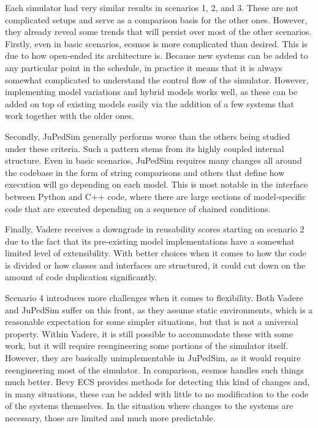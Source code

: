 \documentclass[twoside, 11pt]{article}
\begin{document}
Each simulator had very similar results in scenarios 1, 2, and 3. These are not complicated setups and serve as a comparison basis for the other ones. However, they already reveal some trends that will persist over most of the other scenarios. Firstly, even in basic scenarios, \gls{ecsmos} is more complicated than desired. This is due to how open-ended its architecture is. Because new systems can be added to any particular point in the schedule, in practice it means that it is always somewhat complicated to understand the control flow of the simulator. However, implementing model variations and hybrid models works well, as these can be added on top of existing models easily via the addition of a few systems that work together with the older ones.

Secondly, JuPedSim generally performs worse than the others being studied under these criteria. Such a pattern stems from its highly coupled internal structure. Even in basic scenarios, JuPedSim requires many changes all around the codebase in the form of string comparisons and others that define how execution will go depending on each model. This is most notable in the interface between Python and C++ code, where there are large sections of model-specific code that are executed depending on a sequence of chained conditions.

Finally, Vadere receives a downgrade in reusability scores starting on scenario 2 due to the fact that its pre-existing model implementations have a somewhat limited level of extensibility. With better choices when it comes to how the code is divided or how classes and interfaces are structured, it could cut down on the amount of code duplication significantly.

Scenario 4 introduces more challenges when it comes to flexibility. Both Vadere and JuPedSim suffer on this front, as they assume static environments, which is a reasonable expectation for some simpler situations, but that is not a universal property. Within Vadere, it is still possible to accommodate these with some work, but it will require reengineering some portions of the simulator itself. However, they are basically unimplementable in JuPedSim, as it would require reengineering most of the simulator. In comparison, \gls{ecsmos} handles such things much better. Bevy ECS provides methods for detecting this kind of changes and, in many situations, these can be added with little to no modification to the code of the systems themselves. In the situation where changes to the systems are necessary, those are limited and much more predictable. 
\end{document}
